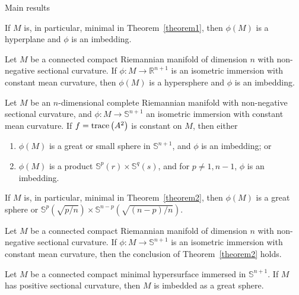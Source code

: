 \begin{frame}[allowframebreaks]{Main results}
  \begin{corollary}\label{corollary1oftheorem1}
    If \(M\) is, in particular, minimal in Theorem~\ref{theorem1}, then
    \(\phi(M)\) is a hyperplane and \(\phi\) is an imbedding.
  \end{corollary}

  \framebreak

  \begin{corollary}\label{corollary2oftheorem1}
    Let \(M\) be a connected compact Riemannian manifold of dimension \(n\)
    with non-negative sectional curvature. If \(\phi:M\to\mathbb{R}^{n+1}\) is
    an isometric immersion with constant mean curvature, then \(\phi(M)\) is a
    hypersphere and \(\phi\) is an imbedding.
  \end{corollary}

  \framebreak

  \begin{theorem}\label{theorem2}
    Let \(M\) be an \(n\)-dimensional complete Riemannian manifold with
    non-negative sectional curvature, and \(\phi:M\to\mathbb{S}^{n+1}\) an
    isometric immersion with constant mean curvature. If \(f=\text{trace}\left({A^{2}}\right)\) is
    constant on \(M\), then either
    \begin{enumerate}
      \item
        \(\phi(M)\) is a great or small sphere in \(\mathbb{S}^{n+1}\), and
        \(\phi\) is an imbedding; or
      \item
        \(\phi(M)\) is a product \(\mathbb{S}^{p}(r)\times\mathbb{S}^{q}(s)\),
        and for \(p\neq{1,n-1}\), \(\phi\) is an imbedding.
    \end{enumerate}
  \end{theorem}

  \framebreak

  \begin{corollary}\label{corollary1oftheorem2}
    If \(M\) is, in particular, minimal in Theorem~\ref{theorem2}, then
    \(\phi(M)\) is a great sphere or
    \(\mathbb{S}^{p}\left(\sqrt{p/n}\right)\times\mathbb{S}^{n-p}\left(\sqrt{(n-p)/n}\right)\).
  \end{corollary}

  \framebreak

  \begin{corollary}\label{corollary3oftheorem2}
    Let \(M\) be a connected compact Riemannian manifold of dimension \(n\)
    with non-negative sectional curvature. If \(\phi:M\to\mathbb{S}^{n+1}\) is
    an isometric immersion with constant mean curvature, then the conclusion of
    Theorem~\ref{theorem2} holds.
  \end{corollary}
  
  \framebreak

  \begin{corollary}\label{corollary3oftheorem2}
    Let \(M\) be a connected compact minimal hypersurface immersed in
    \(\mathbb{S}^{n+1}\). If \(M\) has positive sectional curvature, then \(M\)
    is imbedded as a great sphere.
  \end{corollary}

\end{frame}
